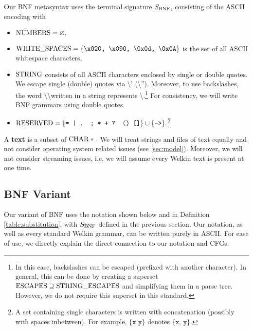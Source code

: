 Our BNF metasyntax uses the terminal signature $S_{\mathrm{BNF}}$, consisting of the ASCII encoding with
\begin{itemize}
  \item $\mathrm{NUMBERS} = \varnothing,$
  \item $\mathrm{WHITE\_SPACES} = \{\texttt{\textbackslash x020, \textbackslash x090, \textbackslash 0x0d, \textbackslash 0x0A}\} $ is the set of all ASCII whitespace characters,
  \item $\mathrm{STRING}$ consists of all ASCII characters enclosed by single or double quotes. We escape single (double) quotes via \textbackslash' (\textbackslash''). Moreover, to use backslashes, the word \textbackslash\textbackslash  written in a string represents \textbackslash.\footnote{In this case, backslashes can be escaped (prefixed with another character). In general, this can be done by creating a superset $\mathrm{ESCAPES} \supseteq \mathrm{STRING\_ESCAPES}$ and simplifying them in a parse tree. However, we do not require this superset in this standard.} For consistency, we will write BNF grammars using double quotes.
  \item $\mathrm{RESERVED} = \{\texttt{= | . ; * + ? () []}\} \cup \{\texttt{->}\}.$\footnote{A set containing single characters is written with concatenation (possibly with spaces inbetween). For example, $\{\texttt{x y}\}$ denotes $\{\texttt{x, y}\}.$}
\end{itemize}


A \textbf{text} is a subset of $\mathrm{CHAR}*.$ We will treat strings and files of text equally and not consider operating system related issues (see \ref{sec:model}). Moreover, we will not consider streaming issues, i.e, we will assume every Welkin text is present at one time.

\subsection{BNF Variant}
Our variant of BNF uses the notation shown below and in Definition \ref{table:substitution}, with $S_{\mathrm{BNF}}$ defined in the previous section. Our notation, as well as every standard Welkin grammar, can be written purely in ASCII. For ease of use, we directly explain the direct connection to our notation and CFGs. %

